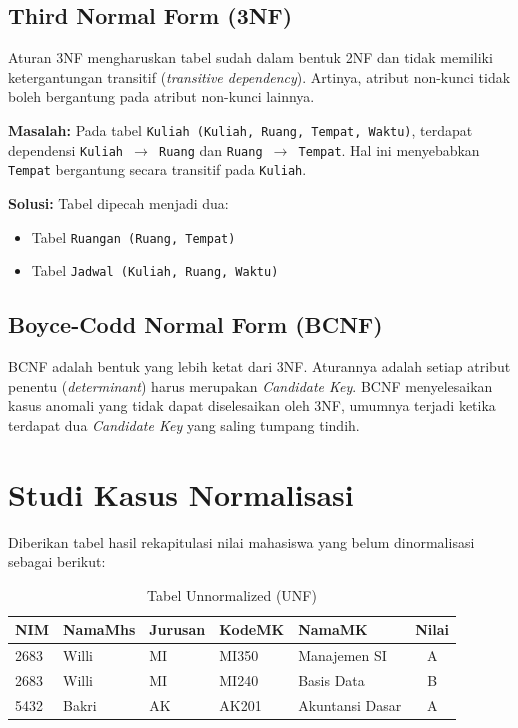 \documentclass[11pt,a4paper]{article}
\begin{document}
\subsection{Third Normal Form (3NF)}
Aturan 3NF mengharuskan tabel sudah dalam bentuk 2NF dan tidak memiliki ketergantungan transitif (\textit{transitive dependency}). Artinya, atribut non-kunci tidak boleh bergantung pada atribut non-kunci lainnya.

\textbf{Masalah:} Pada tabel \texttt{Kuliah (Kuliah, Ruang, Tempat, Waktu)}, terdapat dependensi \texttt{Kuliah \(\rightarrow\) Ruang} dan \texttt{Ruang \(\rightarrow\) Tempat}. Hal ini menyebabkan \texttt{Tempat} bergantung secara transitif pada \texttt{Kuliah}.

\textbf{Solusi:} Tabel dipecah menjadi dua:
\begin{itemize}
	\item Tabel \texttt{Ruangan (Ruang, Tempat)}
	\item Tabel \texttt{Jadwal (Kuliah, Ruang, Waktu)}
\end{itemize}

\subsection{Boyce-Codd Normal Form (BCNF)}
BCNF adalah bentuk yang lebih ketat dari 3NF. Aturannya adalah setiap atribut penentu (\textit{determinant}) harus merupakan \textit{Candidate Key}. BCNF menyelesaikan kasus anomali yang tidak dapat diselesaikan oleh 3NF, umumnya terjadi ketika terdapat dua \textit{Candidate Key} yang saling tumpang tindih.

\section{Studi Kasus Normalisasi}

Diberikan tabel hasil rekapitulasi nilai mahasiswa yang belum dinormalisasi sebagai berikut:

\begin{table}[H]
	\centering
	\small
	\caption{Tabel Unnormalized (UNF)}
	\begin{tabularx}{\textwidth}{@{} l l l l l c @{}}
		\toprule
		\textbf{NIM} & \textbf{NamaMhs} & \textbf{Jurusan} & \textbf{KodeMK} & \textbf{NamaMK} & \textbf{Nilai} \\
		\midrule
		2683         & Willi            & MI               & MI350           & Manajemen SI    & A              \\
		2683         & Willi            & MI               & MI240           & Basis Data      & B              \\
		5432         & Bakri            & AK               & AK201           & Akuntansi Dasar & A              \\
		\bottomrule
	\end{tabularx}
\end{table}
\end{document}
